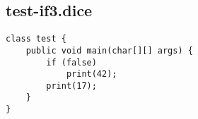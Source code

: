 \subsection{test-if3.dice}
\begin{verbatim}
class test {
	public void main(char[][] args) {	
  		if (false) 
  			print(42);
  		print(17);
	}
}

\end{verbatim}